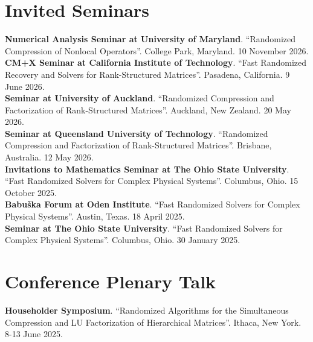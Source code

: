 \documentclass[10pt,margin]{res}
\newcommand{\condensed}[2]{%
  \textbf{#1}.{#2}\\[0.4em]%
}
\begin{document}
\begin{resume}
\section{Invited Seminars}
  \condensed{Numerical Analysis Seminar at University of Maryland}{
  ``Randomized Compression of Nonlocal Operators''.
  College Park, Maryland. 10 November 2026.}
  \condensed{CM+X Seminar at California Institute of Technology}{
  ``Fast Randomized Recovery and Solvers for Rank-Structured Matrices''.
  Pasadena, California. 9 June 2026.}
  \condensed{Seminar at University of Auckland}{
  ``Randomized Compression and Factorization of Rank-Structured Matrices''.
  Auckland, New Zealand. 20 May 2026.}
  \condensed{Seminar at Queensland University of Technology}{
  ``Randomized Compression and Factorization of Rank-Structured Matrices''.
  Brisbane, Australia. 12 May 2026.}
  \condensed{Invitations to Mathematics Seminar at The Ohio State University}{
  ``Fast Randomized Solvers for Complex Physical Systems''.
  Columbus, Ohio. 15 October 2025.}
  \condensed{Babu\v{s}ka Forum at Oden Institute}{
  ``Fast Randomized Solvers for Complex Physical Systems''.
  Austin, Texas. 18 April 2025.}
  \condensed{Seminar at The Ohio State University}{
  ``Fast Randomized Solvers for Complex Physical Systems''.
  Columbus, Ohio. 30 January 2025.}

\vspace{-2em}

\section{Conference Plenary Talk}
  \condensed{Householder Symposium}{
  ``Randomized Algorithms for the Simultaneous Compression and LU Factorization of Hierarchical Matrices''.
  Ithaca, New York. 8-13 June 2025.}

\vspace{-2em}


\end{resume}
\end{document}

